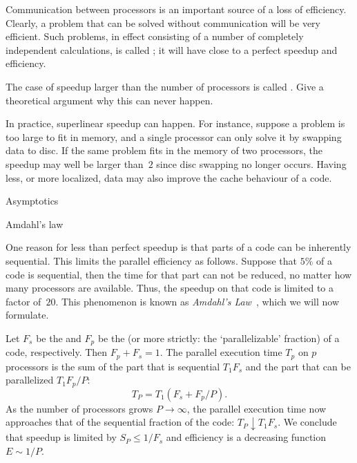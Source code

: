 Communication between processors is an important source of a loss of
efficiency. Clearly, a problem that can be solved without
communication will be very efficient. Such problems, in effect
consisting of a number of completely independent calculations, is
called ; it will have close to a perfect
speedup and efficiency.

\begin{exercise}
  The case of speedup larger than the number of processors is called
  . Give a theoretical argument why
  this can never happen.
\end{exercise}

In practice, superlinear speedup can happen. For instance, suppose a 
problem is too large to fit in memory, and a single processor can only
solve it by swapping data to disc. If the same problem fits in the
memory of two processors, the speedup may well be larger than~$2$
since disc swapping no longer occurs. Having less, or more localized,
data may also improve the cache behaviour of a code.

 {Asymptotics}
\label{sec:asymptotics}


 {Amdahl's law}
\label{sec:amdahl}

One reason for less than perfect speedup is that parts of a code can
be inherently sequential. This limits the parallel efficiency as
follows. Suppose that $5\%$ of a code is sequential, then the time for
that part can not be reduced, no matter how many processors are
available. Thus, the speedup on that code is limited to a factor
of~$20$. This phenomenon is known as \emph{Amdahl's
  Law}~\cite{amd:law}, which we will now formulate.

Let $F_s$ be the
 and
$F_p$ be the  
(or more strictly: the `parallelizable'
fraction) of a code, respectively. Then $F_p+F_s=1$. The parallel
execution time $T_p$ on $p$ processors
is the sum of the part that is sequential
$T_1F_s$ and the part that can be parallelized $T_1F_p/P$:
\begin{equation}
  T_P=T_1(F_s+F_p/P).
  \label{eq:amdahl}
\end{equation}
As the number of processors grows
$P\rightarrow\infty$, the parallel execution time now approaches that
of the sequential fraction of the code: $T_P\downarrow
T_1F_s$. We conclude that speedup is limited by $S_P\leq 1/F_s$ and
efficiency is a decreasing function $E\sim 1/P$.


